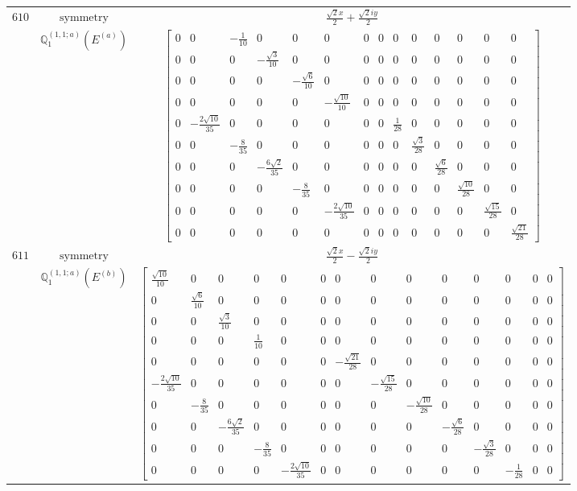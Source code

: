 \documentclass[fleqn,8pt,landscape]{jsarticle}
\begin{document}
\begin{longtable}{ccc}
$ 610 $ & $ \text{symmetry} $ & $ \frac{\sqrt{2} x}{2} + \frac{\sqrt{2} i y}{2} $ \\
$  $ & $ \mathbb{Q}_{1}^{(1,1;a)}(E^{(a)}) $ & $ \begin{bmatrix} 0 & 0 & - \frac{1}{10} & 0 & 0 & 0 & 0 & 0 & 0 & 0 & 0 & 0 & 0 & 0 \\ 0 & 0 & 0 & - \frac{\sqrt{3}}{10} & 0 & 0 & 0 & 0 & 0 & 0 & 0 & 0 & 0 & 0 \\ 0 & 0 & 0 & 0 & - \frac{\sqrt{6}}{10} & 0 & 0 & 0 & 0 & 0 & 0 & 0 & 0 & 0 \\ 0 & 0 & 0 & 0 & 0 & - \frac{\sqrt{10}}{10} & 0 & 0 & 0 & 0 & 0 & 0 & 0 & 0 \\ 0 & - \frac{2 \sqrt{10}}{35} & 0 & 0 & 0 & 0 & 0 & 0 & \frac{1}{28} & 0 & 0 & 0 & 0 & 0 \\ 0 & 0 & - \frac{8}{35} & 0 & 0 & 0 & 0 & 0 & 0 & \frac{\sqrt{3}}{28} & 0 & 0 & 0 & 0 \\ 0 & 0 & 0 & - \frac{6 \sqrt{2}}{35} & 0 & 0 & 0 & 0 & 0 & 0 & \frac{\sqrt{6}}{28} & 0 & 0 & 0 \\ 0 & 0 & 0 & 0 & - \frac{8}{35} & 0 & 0 & 0 & 0 & 0 & 0 & \frac{\sqrt{10}}{28} & 0 & 0 \\ 0 & 0 & 0 & 0 & 0 & - \frac{2 \sqrt{10}}{35} & 0 & 0 & 0 & 0 & 0 & 0 & \frac{\sqrt{15}}{28} & 0 \\ 0 & 0 & 0 & 0 & 0 & 0 & 0 & 0 & 0 & 0 & 0 & 0 & 0 & \frac{\sqrt{21}}{28} \end{bmatrix} $ \\ \hline
$ 611 $ & $ \text{symmetry} $ & $ \frac{\sqrt{2} x}{2} - \frac{\sqrt{2} i y}{2} $ \\
$  $ & $ \mathbb{Q}_{1}^{(1,1;a)}(E^{(b)}) $ & $ \begin{bmatrix} \frac{\sqrt{10}}{10} & 0 & 0 & 0 & 0 & 0 & 0 & 0 & 0 & 0 & 0 & 0 & 0 & 0 \\ 0 & \frac{\sqrt{6}}{10} & 0 & 0 & 0 & 0 & 0 & 0 & 0 & 0 & 0 & 0 & 0 & 0 \\ 0 & 0 & \frac{\sqrt{3}}{10} & 0 & 0 & 0 & 0 & 0 & 0 & 0 & 0 & 0 & 0 & 0 \\ 0 & 0 & 0 & \frac{1}{10} & 0 & 0 & 0 & 0 & 0 & 0 & 0 & 0 & 0 & 0 \\ 0 & 0 & 0 & 0 & 0 & 0 & - \frac{\sqrt{21}}{28} & 0 & 0 & 0 & 0 & 0 & 0 & 0 \\ - \frac{2 \sqrt{10}}{35} & 0 & 0 & 0 & 0 & 0 & 0 & - \frac{\sqrt{15}}{28} & 0 & 0 & 0 & 0 & 0 & 0 \\ 0 & - \frac{8}{35} & 0 & 0 & 0 & 0 & 0 & 0 & - \frac{\sqrt{10}}{28} & 0 & 0 & 0 & 0 & 0 \\ 0 & 0 & - \frac{6 \sqrt{2}}{35} & 0 & 0 & 0 & 0 & 0 & 0 & - \frac{\sqrt{6}}{28} & 0 & 0 & 0 & 0 \\ 0 & 0 & 0 & - \frac{8}{35} & 0 & 0 & 0 & 0 & 0 & 0 & - \frac{\sqrt{3}}{28} & 0 & 0 & 0 \\ 0 & 0 & 0 & 0 & - \frac{2 \sqrt{10}}{35} & 0 & 0 & 0 & 0 & 0 & 0 & - \frac{1}{28} & 0 & 0 \end{bmatrix} $ \\ \hline

\end{longtable}
\end{document}
